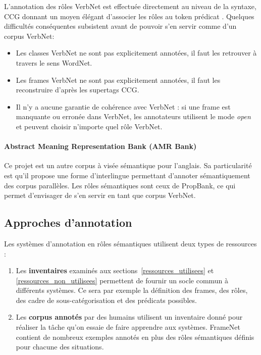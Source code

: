 L'annotation des rôles VerbNet est effectuée directement au niveau de la
syntaxe, CCG donnant un moyen élégant d'associer les rôles au token prédicat
\citep{bos2012annotating}. Quelques difficultés conséquentes subsistent avant
de pouvoir s'en servir comme d'un corpus VerbNet:

\begin{itemize}
    \item Les classes VerbNet ne sont pas explicitement annotées, il faut les
        retrouver à travers le sens WordNet.
    \item Les frames VerbNet ne sont pas explicitement annotées, il faut les
        reconstruire d'après les supertags CCG.
    \item Il n'y a aucune garantie de cohérence avec VerbNet : si une frame est
        manquante ou erronée dans VerbNet, les annotateurs utilisent le mode
        \textit{open} et peuvent choisir n'importe quel rôle VerbNet.
\end{itemize}

\paragraph{Abstract Meaning Representation Bank (AMR Bank)}

Ce projet \citep{banarescu2013abstract} est un autre corpus à visée sémantique
pour l'anglais. Sa particularité est qu'il propose une forme d'interlingue
permettant d'annoter sémantiquement des corpus parallèles. Les rôles
sémantiques sont ceux de PropBank, ce qui permet d'envisager de s'en servir en
tant que corpus VerbNet.

\subsection{Approches d'annotation}

Les systèmes d'annotation en rôles sémantiques utilisent deux types de
ressources :

\begin{enumerate}
    \item Les \textbf{inventaires} examinés aux
        sections~\ref{ressources_utilisees} et \ref{ressources_non_utilisees}
        permettent de fournir un socle commun à différents systèmes. Ce sera
        par exemple la définition des frames, des rôles, des cadre de
        sous-catégorisation et des prédicats possibles.
    \item Les \textbf{corpus annotés} par des humains utilisent un inventaire
        donné pour réaliser la tâche qu'on essaie de faire apprendre aux
        systèmes. FrameNet contient de nombreux exemples annotés en plus des
        rôles sémantiques définis pour chacune des situations.
\end{enumerate}

